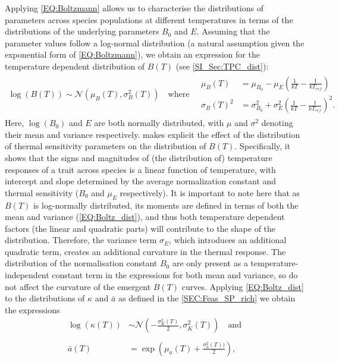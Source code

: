 \documentclass{article}
\begin{document}
Applying \cref{EQ:Boltzmann} allows us to characterise the distributions of parameters across species populations at different temperatures in terms of the distributions of the underlying parameters $B_0$ and $E$. Assuming that the parameter values follow a log-normal distribution (a natural assumption given the exponential form of \cref{EQ:Boltzmann}), we obtain an expression for the temperature dependent distribution of $B(T)$ (see \cref{SI_Sec:TPC_dist}):
\begin{align} \label{EQ:Boltz_dist}
    \log(B(T)) \sim \mathcal{N}\left(\mu_{B}(T) , \sigma_{B}^2(T) \right) 
    \quad \text{where} \quad
    \begin{array}{cc}
        \mu_B(T) &= \mu_{B_0} - \mu_{E} \left(\frac{1}{kT} - \frac{1}{k T_{ref} }\right)  \\
        \sigma_{B}(T)^2 &= \sigma_{B_0}^2 + \sigma_{E}^2 \left(\frac{1}{kT} - \frac{1}{k T_{ref} }\right)^2 .
    \end{array}
\end{align}
Here, $\log(B_0)$ and $E$ are both normally distributed, with $\mu$ and $\sigma^2$ denoting their mean and variance respectively.  makes explicit the effect of the distribution of thermal sensitivity parameters on the distribution of $B(T)$. Specifically, it shows that the signs and magnitudes of (the distribution of) temperature responses of a trait across species is a linear function of temperature, with intercept and slope determined by the average normalization constant and thermal sensitivity ($B_0$ and $\mu_E$ respectively). It is important to note here that as $B(T)$ is log-normally distributed, its moments are defined in terms of both the mean and variance (\cref{EQ:Boltz_dist}), and thus both temperature dependent factors (the linear and quadratic parts) will contribute to the shape of the distribution. Therefore, the variance term $\sigma_E$, which introduces an additional quadratic term, creates an additional curvature in the thermal response. The distribution of the normalisation constant $B_0$ are only present as a temperature-independent constant term in the expressions for both mean and variance, so do not affect the curvature of the emergent $B(T)$ curves. Applying \cref{EQ:Boltz_dist} to the distributions of $\kappa$ and $\bar{a}$ as defined in the \cref{SEC:Feas_SP_rich} we obtain the expressions
\begin{align} 
        \log(\kappa(T)) &\sim \mathcal{N}\left( -\frac{\sigma_{K}^2(T)}{2} , \sigma_{K}^2(T) \right) \quad \text{and} \label{EQ:Trait_distributions_K} \\ \nonumber \\
        \bar{a}(T) &= \exp \left(\mu_a(T) + \frac{\sigma_a^2(T))}{2} \right) \label{EQ:Trait_distributions_a},
\end{align}
\end{document}
